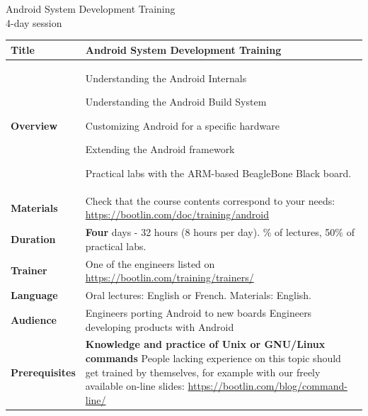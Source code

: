 \documentclass[a4paper,12pt,obeyspaces,spaces,hyphens]{article}
\begin{document}
\thispagestyle{fancy}

\setlength{\arrayrulewidth}{0.8pt}

\begin{center}
\LARGE
Android System Development Training\\
\large
4-day session
\end{center}
\vspace{1cm}

\small
{}

 {
  \begin{tabularx}{\textwidth}{|g|h|}
    {\bf Title} & {\bf Android System Development Training}\\
    \hline

    {\bf Overview} &
    Understanding the Android Internals \par
    Understanding the Android Build System \par
    Customizing Android for a specific hardware \par
    Extending the Android framework \par
    Practical labs with the ARM-based BeagleBone Black board. \\
    \hline
    {\bf Materials} &
    Check that the course contents correspond to your needs:
    \url{https://bootlin.com/doc/training/android} \\
    \hline

    {\bf Duration} & {\bf Four} days - 32 hours (8 hours per day).
    \% of lectures, 50\% of practical labs. \\
    \hline

    {\bf Trainer} & One of the engineers listed on
    \newline \url{https://bootlin.com/training/trainers/}\\
    \hline

    {\bf Language} & Oral lectures: English or French.
    \newline Materials: English.\\
    \hline

    {\bf Audience} & Engineers porting Android to new boards
    \newline Engineers developing products with Android \\
    \hline

    {\bf Prerequisites} & {\bf Knowledge and practice of Unix or
      GNU/Linux commands}
    \newline People lacking experience on this topic should get
    trained by themselves, for example with our freely available
    on-line slides:
    \newline \url{https://bootlin.com/blog/command-line/} \vspace{1em}
     \\
    \hline
  \end{tabularx}

}
\end{document}
